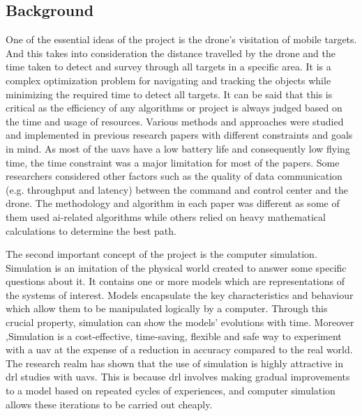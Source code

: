\documentclass[../main.tex]{subfiles}
\begin{document}
\subsection{Background}

One of the essential ideas of the project 
is the drone's visitation of mobile 
targets. And this takes into consideration 
the distance travelled by the drone and 
the time taken to detect and survey 
through all targets in a specific area.
It is a complex optimization problem 
for navigating and tracking the objects 
while minimizing the required time to detect all targets.
It can be said that this is critical as the efficiency of any algorithms 
or project is always judged based on the time 
and usage of resources.
Various methods and approaches were studied 
and implemented 
in previous research papers with different 
constraints and 
goals in mind.
As most of the \glspl{uav} have a low battery life 
and consequently low flying time, the time 
constraint was a major limitation 
for most of the papers. 
Some researchers considered other factors such 
as the quality 
of data communication (e.g. throughput and latency) 
between the command and control 
center and the drone.
The methodology and algorithm in each paper was 
different 
as some of them used \gls{ai}-related algorithms while 
others relied 
on heavy mathematical calculations to determine 
the best path.

The second important concept of the project is the computer simulation.
Simulation is an imitation of the physical world
created to answer some specific questions about it.
It contains one or more models 
which are representations of the systems of interest.
Models encapsulate the key characteristics and behaviour 
which allow them to be manipulated logically by a computer.
Through this crucial property, simulation can show 
the models' evolutions with time.
Moreover ,Simulation is a cost-effective, time-saving, flexible 
and safe way to experiment with a \gls{uav}
at the expense of a reduction in accuracy compared to the real world.
The research realm has shown that the use of simulation 
is highly attractive in \gls{drl} studies with \glspl{uav}.
This is because \gls{drl} involves
making gradual improvements to a model based on 
repeated cycles of experiences, and computer simulation 
allows these iterations to be carried out cheaply.
\end{document}
